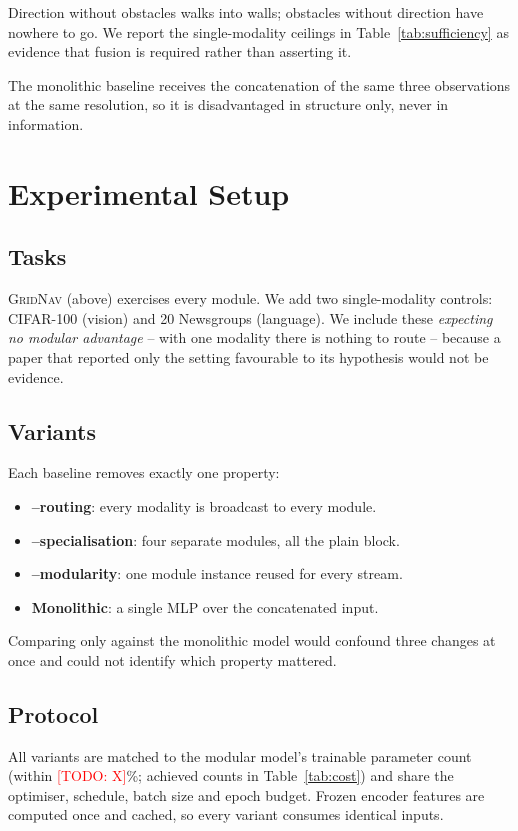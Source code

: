 \documentclass[conference]{IEEEtran}
\newcommand{\todo}[1]{\textcolor{red}{[TODO: #1]}}
\begin{document}
Direction without obstacles walks into walls; obstacles without direction have
nowhere to go. We report the single-modality ceilings in
Table~\ref{tab:sufficiency} as evidence that fusion is required rather than
asserting it.

The monolithic baseline receives the concatenation of the same three
observations at the same resolution, so it is disadvantaged in structure only,
never in information.

\section{Experimental Setup}
\label{sec:setup}

\subsection{Tasks}
\textsc{GridNav} (above) exercises every module. We add two single-modality
controls: CIFAR-100 (vision) and 20 Newsgroups (language). We include these
\emph{expecting no modular advantage} -- with one modality there is nothing to
route -- because a paper that reported only the setting favourable to its
hypothesis would not be evidence.

\subsection{Variants}
Each baseline removes exactly one property:
\begin{itemize}
  \item \textbf{--routing}: every modality is broadcast to every module.
  \item \textbf{--specialisation}: four separate modules, all the plain block.
  \item \textbf{--modularity}: one module instance reused for every stream.
  \item \textbf{Monolithic}: a single MLP over the concatenated input.
\end{itemize}
Comparing only against the monolithic model would confound three changes at
once and could not identify which property mattered.

\subsection{Protocol}
All variants are matched to the modular model's trainable parameter count
(within \todo{X}\%; achieved counts in Table~\ref{tab:cost}) and share the
optimiser, schedule, batch size and epoch budget. Frozen encoder features are
computed once and cached, so every variant consumes identical inputs.
\end{document}
